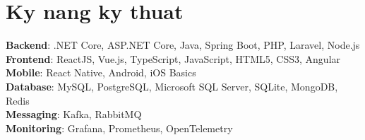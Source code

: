 \documentclass[letterpaper,11pt]{article}
\begin{document}
\section{Ky nang ky thuat}
 \begin{itemize}[leftmargin=0.15in, label={}]
    \small{\item{
     \textbf{Backend}{: .NET Core, ASP.NET Core, Java, Spring Boot, PHP, Laravel, Node.js} \\
     \textbf{Frontend}{: ReactJS, Vue.js, TypeScript, JavaScript, HTML5, CSS3, Angular} \\
     \textbf{Mobile}{: React Native, Android, iOS Basics} \\
     \textbf{Database}{: MySQL, PostgreSQL, Microsoft SQL Server, SQLite, MongoDB, Redis} \\
     \textbf{Messaging}{: Kafka, RabbitMQ} \\
     \textbf{Monitoring}{: Grafana, Prometheus, OpenTelemetry}
    }}
 \end{itemize}
\end{document}
